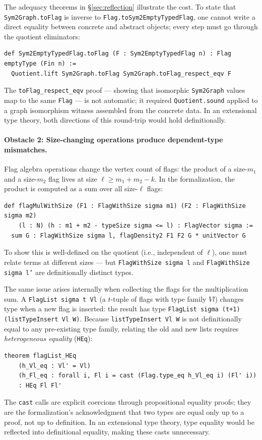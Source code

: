 \documentclass{article}
\newcommand{\lean}[1]{\texttt{#1}}
\begin{document}
The adequacy theorems in \S\ref{sec:reflection} illustrate the cost.  To state
that \lean{Sym2Graph.toFlag} is inverse to \lean{Flag.toSym2EmptyTypedFlag}, one
cannot write a direct equality between concrete and abstract objects; every step
must go through the quotient eliminators:
\begin{lstlisting}
def Sym2EmptyTypedFlag.toFlag (F : Sym2EmptyTypedFlag n) : Flag emptyType (Fin n) :=
  Quotient.lift Sym2Graph.toFlag Sym2Graph.toFlag_respect_eqv F
\end{lstlisting}
The \lean{toFlag\_respect\_eqv} proof --- showing that isomorphic \lean{Sym2Graph}
values map to the same \lean{Flag} --- is not automatic; it required
\lean{Quotient.sound} applied to a graph isomorphism witness assembled from the
concrete data.  In an extensional type theory, both directions of this round-trip
would hold definitionally.

\paragraph{Obstacle 2: Size-changing operations produce dependent-type mismatches.}
Flag algebra operations change the vertex count of flags: the product of a
size-$m_1$ and a size-$m_2$ flag lives at size $\ell \geq m_1 + m_2 - k$.
In the formalization, the product is computed as a sum over all size-$\ell$ flags:
\begin{lstlisting}
def flagMulWithSize (F1 : FlagWithSize sigma m1) (F2 : FlagWithSize sigma m2)
    (l : N) (h : m1 + m2 - typeSize sigma <= l) : FlagVector sigma :=
  sum G : FlagWithSize sigma l, flagDensity2 F1 F2 G * unitVector G
\end{lstlisting}
To show this is well-defined on the quotient (i.e., independent of $\ell$),
one must relate terms at different sizes --- but \lean{FlagWithSize sigma l}
and \lean{FlagWithSize sigma l'} are definitionally distinct types.

The same issue arises internally when collecting the flags for the multiplication
sum.  A \lean{FlagList sigma t Vl} (a $t$-tuple of flags with type family $Vl$)
changes type when a new flag is inserted: the result has type
\lean{FlagList sigma (t+1) (listTypeInsert Vl W)}.  Because
\lean{listTypeInsert Vl W} is not definitionally equal to any pre-existing type
family, relating the old and new lists requires \emph{heterogeneous equality}
(\lean{HEq}):
\begin{lstlisting}
theorem flagList_HEq
    (h_Vl_eq : Vl' = Vl)
    (h_Fl_eq : forall i, Fl i = cast (Flag.type_eq h_Vl_eq i) (Fl' i))
    : HEq Fl Fl'
\end{lstlisting}
The \lean{cast} calls are explicit coercions through propositional equality proofs;
they are the formalization's acknowledgment that two types are equal only up to a
proof, not up to definition.  In an extensional type theory, type equality would
be reflected into definitional equality, making these casts unnecessary.
\end{document}
